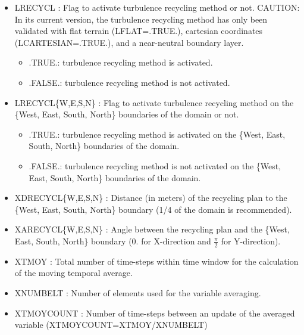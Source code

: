 \begin{itemize}
 
\item LRECYCL : Flag to
  activate turbulence recycling method or not. CAUTION: In its
  current version, the turbulence recycling method has only been validated with
  flat terrain (LFLAT=.TRUE.), cartesian coordinates
  (LCARTESIAN=.TRUE.), and a near-neutral boundary layer.
\begin{itemize}
\item .TRUE.: turbulence recycling method is activated.
\item .FALSE.: turbulence recycling method is not activated.
\end{itemize}

\item LRECYCL\{W,E,S,N\} : Flag to
  activate turbulence recycling method on the \{West, East, South, North\} boundaries of the domain or not.
\begin{itemize}
\item .TRUE.: turbulence recycling method is activated on the \{West, East, South, North\} boundaries of the domain.
\item .FALSE.: turbulence recycling method is not activated on the \{West, East, South, North\} boundaries of the domain.
\end{itemize}

\item XDRECYCL\{W,E,S,N\} : Distance (in meters) of the recycling plan to the \{West, East, South, North\} boundary (1/4 of the domain is recommended).

\item XARECYCL\{W,E,S,N\} : Angle between the recycling plan and the \{West, East, South, North\} boundary (0. for X-direction and
$\frac{\pi}{2}$ for Y-direction).

\item XTMOY : Total number of time-steps within time window
for the calculation of the moving temporal average.

\item XNUMBELT : Number of elements used for the variable averaging.

\item XTMOYCOUNT : Number of time-steps between an update of the averaged variable (XTMOYCOUNT=XTMOY/XNUMBELT)


\end{itemize}

